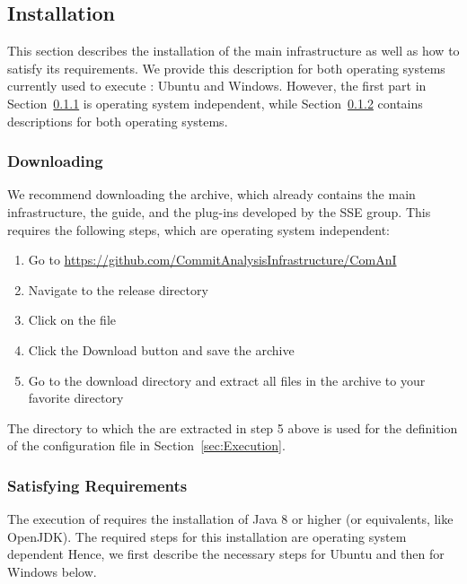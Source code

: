 \subsection{Installation}
\label{sec:Installation}
This section describes the installation of the main infrastructure as well as how to satisfy its requirements. We provide this description for both operating systems currently used to execute \thetool{}: Ubuntu and Windows. However, the first part in Section~\ref{sec:Download} is operating system independent, while Section~\ref{sec:Requirements} contains descriptions for both operating systems.

\subsubsection{Downloading \thetool{}}
\label{sec:Download}
We recommend downloading the  archive, which already contains the main infrastructure, the guide, and the plug-ins developed by the SSE group. This requires the following steps, which are operating system independent:
\begin{enumerate}
	\item Go to \url{https://github.com/CommitAnalysisInfrastructure/ComAnI}
	\item Navigate to the release directory
	\item Click on the  file
	\item Click the Download button and save the archive
	\item Go to the download directory and extract all files in the  archive to your favorite directory
\end{enumerate}
The directory to which the  are extracted in step 5 above is used for the definition of the configuration file in Section~\ref{sec:Execution}.

\subsubsection{Satisfying Requirements}
\label{sec:Requirements}
The execution of \thetool{} requires the installation of Java 8 or higher (or equivalents, like OpenJDK). The required steps for this installation are operating system dependent Hence, we first describe the necessary steps for Ubuntu and then for Windows below.


